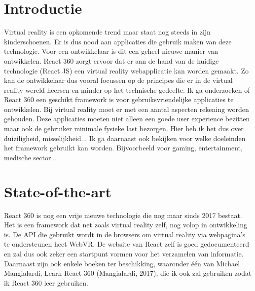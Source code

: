 
\section{Introductie} %
\label{sec:introductie}

Virtual reality is een opkomende trend maar staat nog steeds in zijn kinderschoenen. Er is dus nood aan applicaties die gebruik maken van deze technologie. Voor een ontwikkelaar is dit een geheel nieuwe manier van ontwikkelen. React 360 zorgt ervoor dat er aan de hand van de huidige technologie (React JS) een virtual reality webapplicatie kan worden gemaakt. Zo kan de ontwikkelaar dus vooral focussen op de principes die er in de virtual reality wereld heersen en minder op het technische gedeelte. Ik ga onderzoeken of React 360 een geschikt framework is voor gebruiksvriendelijke applicaties te ontwikkelen. Bij virtual reality moet er met een aantal aspecten rekening worden gehouden. Deze applicaties moeten niet alleen een goede user experience bezitten maar ook de gebruiker minimale fysieke last bezorgen. Hier heb ik het dus over duiziligheid, misselijkheid... Ik ga daarnaast ook bekijken voor welke doeleinden het framework gebruikt kan worden. Bijvoorbeeld voor gaming, entertainment, medische sector...


\section{State-of-the-art}
\label{sec:state-of-the-art}

React 360 is nog een vrije nieuwe technologie die nog maar sinds 2017 bestaat. Het is een framework dat net zoals virtual reality zelf, nog volop in ontwikkeling is. De API die gebruikt wordt in de browsers om virtual reality via webpagina's te ondersteunen heet WebVR. De website van React zelf is goed gedocumenteerd en zal dus ook zeker een startpunt vormen voor het verzamelen van informatie. Daarnaast zijn ook enkele boeken ter beschikking, waaronder één van Michael Mangialardi, Learn React 360 (Mangialardi, 2017), die ik ook zal gebruiken zodat ik React 360 leer gebruiken.

